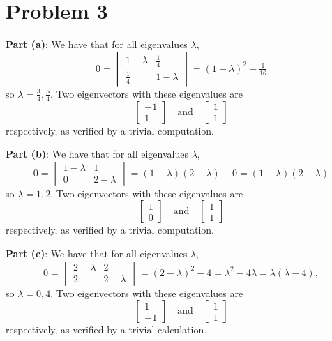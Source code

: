 \documentclass[11pt]{article}
\begin{document}
\section{Problem 3}

\textbf{Part (a)}: We have that for all eigenvalues $\lambda$,
\[
	0 = \begin{vmatrix} 1 - \lambda & \tfrac{1}{4} \\ \tfrac{1}{4} & 1 - \lambda \end{vmatrix} = (1 - \lambda)^{2} - \tfrac{1}{16}
\]
so $\boxed{\lambda = \tfrac{3}{4}, \tfrac{5}{4}}$. Two eigenvectors with these eigenvalues are 
\[
	\boxed{\begin{bmatrix} -1 \\ 1 \end{bmatrix} \quad \text{and} \quad \begin{bmatrix} 1 \\ 1 \end{bmatrix}}
\]
respectively, as verified by a trivial computation.

\textbf{Part (b)}: We have that for all eigenvalues $\lambda$,
\[
	0 = \begin{vmatrix} 1 - \lambda & 1 \\ 0 & 2 - \lambda \end{vmatrix} = (1 - \lambda)(2 - \lambda) - 0 = (1 - \lambda)(2 - \lambda)
\]
so $\boxed{\lambda = 1, 2}$. Two eigenvectors with these eigenvalues are
\[
	\boxed{ \begin{bmatrix} 1 \\ 0 \end{bmatrix} \quad \text{and} \quad \begin{bmatrix} 1 \\ 1 \end{bmatrix}}
\]
respectively, as verified by a trivial computation.

\textbf{Part (c)}: We have that for all eigenvalues $\lambda$, 
\[
	0 = \begin{vmatrix} 2 - \lambda & 2 \\ 2 & 2 - \lambda \end{vmatrix} = (2 - \lambda)^{2} - 4 = \lambda^{2} - 4\lambda = \lambda(\lambda - 4),
\]
so $\boxed{\lambda = 0, 4}$. Two eigenvectors with these eigenvalues are
\[
	\boxed{\begin{bmatrix} 1 \\ -1 \end{bmatrix} \quad \text{and} \quad \begin{bmatrix} 1 \\ 1 \end{bmatrix}}
\]
respectively, as verified by a trivial calculation.
\end{document}
